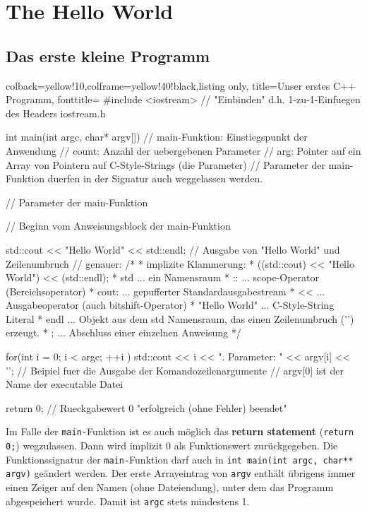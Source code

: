 \documentclass[a4paper]{report}
\begin{document}
\section{The Hello World}

\subsection{Das erste kleine Programm}
\begin{tcblisting}{colback=yellow!10,colframe=yellow!40!black,listing only,
		title=Unser erstes C++ Programm, fonttitle=\bfseries}
#include <iostream>
// "Einbinden" d.h. 1-zu-1-Einfuegen des Headers iostream.h

int main(int argc, char* argv[])
// main-Funktion: Einstiegspunkt der Anwendung
// count: Anzahl der uebergebenen Parameter 
// arg: Pointer auf ein Array von Pointern auf C-Style-Strings (die Parameter)
// Parameter der main-Funktion duerfen in der Signatur auch weggelassen werden.

// Parameter der main-Funktion 
{   // Beginn vom Anweisungsblock der main-Funktion
	
	std::cout << "Hello World" << std::endl;
	// Ausgabe von "Hello World" und Zeilenumbruch
	// genauer:
	/*
	* implizite Klammerung:
	* ((std::cout) << "Hello World") << (std::endl);
	* std              ... ein Namensraum
	* ::               ... scope-Operator (Bereichsoperator)
	* cout:            ... gepufferter Standardausgabestream
	* <<               ... Ausgabeoperator (auch bitshift-Operator)
	* "Hello World"    ... C-Style-String Literal
	* endl             ... Objekt aus dem std Namensraum, das einen Zeilenumbruch ('\n') erzeugt.
	* ;                ... Abschluss einer einzelnen Anweisung
	*/
	
	for(int i = 0; i < argc; ++i ){
		std::cout << i << ". Parameter:  " << argv[i] << '\n';
	} // Beipiel fuer die Ausgabe der Komandozeilenargumente
	// argv[0] ist der Name der executable Datei
	
	return 0; // Rueckgabewert 0 "erfolgreich (ohne Fehler) beendet"
}
\end{tcblisting}
Im Falle der \texttt{main-}Funktion ist es auch möglich das \textbf{return statement} (\texttt{return 0;}) wegzulassen. Dann wird implizit 0 als Funktionswert zurückgegeben. Die Funktionssignatur der \texttt{main-}Funktion darf auch in \texttt{int main(int argc, char** argv)} geändert werden. Der erste Arrayeintrag von \texttt{argv} enthält übrigens immer einen Zeiger auf den Namen (ohne Dateiendung), unter dem das Programm abgespeichert wurde. Damit ist \texttt{argc} stets mindestens 1. 
\end{document}
